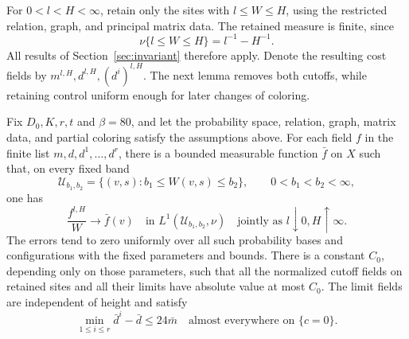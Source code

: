 For $0<l<H<\infty$, retain only the sites with $l\leq W\leq H$, using the
restricted relation, graph, and principal matrix data.  The retained
measure is finite, since
\[
 \nu\{l\leq W\leq H\}=l^{-1}-H^{-1}.
\]
All results of Section~\ref{sec:invariant} therefore apply.  Denote the
resulting cost fields by $m^{l,H},d^{l,H},(d^i)^{l,H}$.  The next lemma
removes both cutoffs, while retaining control uniform enough for later
changes of coloring.

\begin{lemma}
\label{lem:homogeneous-costs}
Fix $D_0,K,r,t$ and $\beta=80$, and let the probability space, relation,
graph, matrix data, and partial coloring satisfy the assumptions above.
For each field $f$ in the finite list $m,d,d^1,\ldots,d^r$, there is a
bounded measurable function $\bar f$ on $X$ such that, on every fixed band
\[
 \mathcal U_{b_1,b_2}=\{(v,s):b_1\leq W(v,s)\leq b_2\},
 \qquad 0<b_1<b_2<\infty,
\]
one has
\begin{equation}
 \frac{f^{l,H}}{W}\longrightarrow\bar f(v)
 \quad\text{in }L^1(\mathcal U_{b_1,b_2},\nu)
 \quad\text{jointly as }l\downarrow0, H\uparrow\infty.
 \label{eq:coloring-band-limit}
\end{equation}
The errors tend to zero uniformly over all such probability bases and
configurations with the fixed parameters and bounds.  There is a constant
$C_0$, depending only on those parameters, such that all the normalized
cutoff fields on retained sites and all their limits have absolute value
at most $C_0$.
The limit fields are independent of height and satisfy
\begin{equation}
 \min_{1\leq i\leq r}\bar d^{i}-\bar d
      \leq24\bar m
 \quad\text{almost everywhere on }\{c=0\}.
 \label{eq:coloring-limit-assignment}
\end{equation}
\end{lemma}


